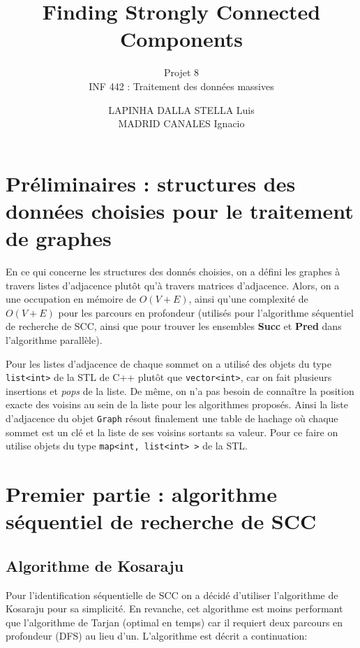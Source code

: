 \documentclass[a4paper,12pt,twoside]{article}
\title[INF442 8 : Finding SCC]{Finding Strongly Connected Components}
\subtitle{Projet 8 \\ INF 442 : Traitement des données massives}
\author{LAPINHA DALLA STELLA Luis \\ MADRID CANALES Ignacio}
\begin{document}
\maketitle

\tableofcontents

\newpage

\section{Préliminaires : structures des données choisies pour le traitement de graphes}

En ce qui concerne les structures des donnés choisies, on a défini les graphes à travers listes d’adjacence plutôt qu’à travers matrices d’adjacence. Alors, on a une occupation en mémoire de $O(V+E)$, ainsi qu’une complexité de $O(V+E)$ pour les parcours en profondeur (utilisés pour l’algorithme séquentiel de recherche de SCC, ainsi que pour trouver les ensembles \textbf{Succ} et \textbf{Pred} dans l’algorithme parallèle).

Pour les listes d’adjacence de chaque sommet on a utilisé des objets du type \texttt{list<int>} de la STL de C++ plutôt que \texttt{vector<int>}, car on fait plusieurs insertions et \textit{pops} de la liste. De même, on n’a pas besoin de connaître la position exacte des voisins au sein de la liste pour les algorithmes proposés. Ainsi la liste d’adjacence du objet \texttt{Graph} résout finalement une table de hachage où chaque sommet est un clé et la liste de ses voisins sortants sa valeur. Pour ce faire on utilise objets du type \texttt{map<int, list<int> >} de la STL. 
 


\newpage
\section{Premier partie : algorithme séquentiel de recherche de SCC}

\subsection{Algorithme de Kosaraju}

Pour l'identification séquentielle de SCC on a décidé d'utiliser l'algorithme de Kosaraju pour sa simplicité. En revanche, cet algorithme est moins performant que l'algorithme de Tarjan (optimal en temps) car il requiert deux parcours en profondeur (DFS) au lieu d'un. L'algorithme est décrit a continuation:
\end{document}
